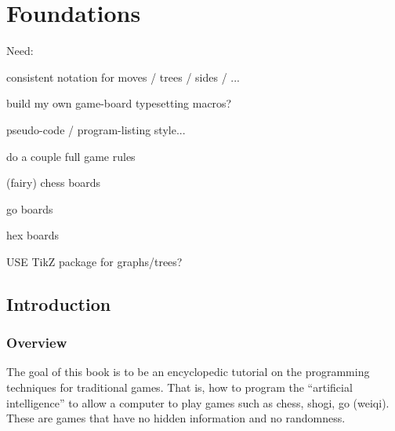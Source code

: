 \documentclass[10pt,dvipdfmx,letterpaper]{report}
\begin{document}

\tableofcontents

\part{Foundations}





Need:

consistent notation for moves / trees / sides / ...

build my own game-board typesetting macros?

pseudo-code / program-listing style...

do a couple full game rules

(fairy) chess boards

go boards

hex boards

USE TikZ package for graphs/trees?

\chapter{Introduction}
\label{chap-introduction}

\section{Overview}

The goal of this book is to be an encyclopedic tutorial on the programming techniques for
traditional games.  That is, how to program the ``artificial intelligence'' to allow
a computer to play games such as chess, shogi, go (weiqi).  These are games that have no hidden
information and no randomness.
\end{document}
